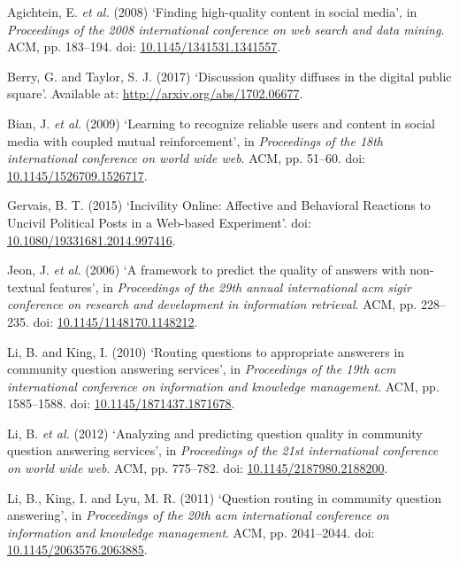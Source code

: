 \documentclass[12pt,preprint, authoryear]{article}
\numberwithin{equation}{section}
\numberwithin{figure}{section}
\numberwithin{table}{section}
\begin{document}
\hypertarget{refs}{}
\hypertarget{ref-Agichtein2008}{}
Agichtein, E. \emph{et al.} (2008) `Finding high-quality content in
social media', in \emph{Proceedings of the 2008 international conference
on web search and data mining}. ACM, pp. 183--194. doi:
\href{https://doi.org/10.1145/1341531.1341557}{10.1145/1341531.1341557}.

\hypertarget{ref-Berry2017}{}
Berry, G. and Taylor, S. J. (2017) `Discussion quality diffuses in the
digital public square'. Available at:
\url{http://arxiv.org/abs/1702.06677}.

\hypertarget{ref-Bian2009}{}
Bian, J. \emph{et al.} (2009) `Learning to recognize reliable users and
content in social media with coupled mutual reinforcement', in
\emph{Proceedings of the 18th international conference on world wide
web}. ACM, pp. 51--60. doi:
\href{https://doi.org/10.1145/1526709.1526717}{10.1145/1526709.1526717}.

\hypertarget{ref-Gervais2015}{}
Gervais, B. T. (2015) `Incivility Online: Affective and Behavioral
Reactions to Uncivil Political Posts in a Web-based Experiment'. doi:
\href{https://doi.org/10.1080/19331681.2014.997416}{10.1080/19331681.2014.997416}.

\hypertarget{ref-Jeon2006}{}
Jeon, J. \emph{et al.} (2006) `A framework to predict the quality of
answers with non-textual features', in \emph{Proceedings of the 29th
annual international acm sigir conference on research and development in
information retrieval}. ACM, pp. 228--235. doi:
\href{https://doi.org/10.1145/1148170.1148212}{10.1145/1148170.1148212}.

\hypertarget{ref-Li2010}{}
Li, B. and King, I. (2010) `Routing questions to appropriate answerers
in community question answering services', in \emph{Proceedings of the
19th acm international conference on information and knowledge
management}. ACM, pp. 1585--1588. doi:
\href{https://doi.org/10.1145/1871437.1871678}{10.1145/1871437.1871678}.

\hypertarget{ref-Li2012}{}
Li, B. \emph{et al.} (2012) `Analyzing and predicting question quality
in community question answering services', in \emph{Proceedings of the
21st international conference on world wide web}. ACM, pp. 775--782.
doi:
\href{https://doi.org/10.1145/2187980.2188200}{10.1145/2187980.2188200}.

\hypertarget{ref-Li2011}{}
Li, B., King, I. and Lyu, M. R. (2011) `Question routing in community
question answering', in \emph{Proceedings of the 20th acm international
conference on information and knowledge management}. ACM, pp.
2041--2044. doi:
\href{https://doi.org/10.1145/2063576.2063885}{10.1145/2063576.2063885}.
\end{document}
